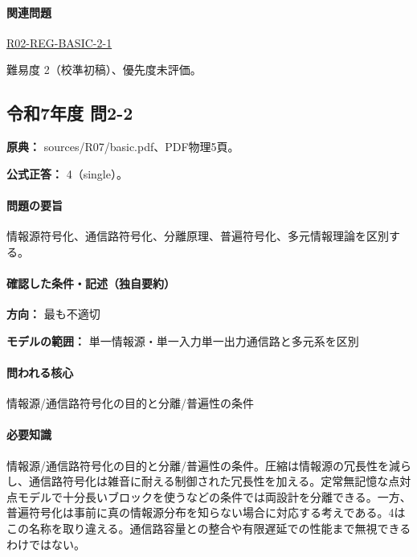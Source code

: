 \paragraph{関連問題} \hyperref[q:r02-reg-basic-2-1]{R02-REG-BASIC-2-1}

\par 難易度 2（校準初稿）、優先度未評価。

\subsection{令和7年度 問2-2}
\label{q:r07-reg-basic-2-2}

\noindent\textbf{原典：} sources/R07/basic.pdf、PDF物理5頁。

\textbf{公式正答：} 4（single）。

\paragraph{問題の要旨} 情報源符号化、通信路符号化、分離原理、普遍符号化、多元情報理論を区別する。

\paragraph{確認した条件・記述（独自要約）}\mbox{}\par

\noindent\textbf{方向：} 最も不適切\par

\noindent\textbf{モデルの範囲：} 単一情報源・単一入力単一出力通信路と多元系を区別\par

\paragraph{問われる核心} 情報源/通信路符号化の目的と分離/普遍性の条件

\paragraph{必要知識} 情報源/通信路符号化の目的と分離/普遍性の条件。圧縮は情報源の冗長性を減らし、通信路符号化は雑音に耐える制御された冗長性を加える。定常無記憶な点対点モデルで十分長いブロックを使うなどの条件では両設計を分離できる。一方、普遍符号化は事前に真の情報源分布を知らない場合に対応する考えである。4はこの名称を取り違える。通信路容量との整合や有限遅延での性能まで無視できるわけではない。

